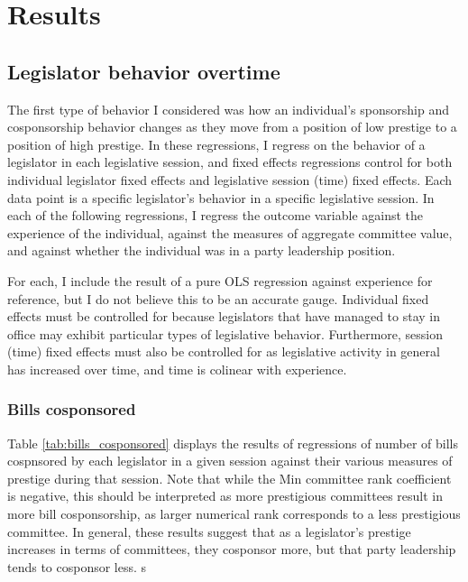 \documentclass{article}
\begin{document}
\section{Results} 
\subsection{Legislator behavior overtime}
The first type of behavior I considered was how an individual's sponsorship and cosponsorship behavior changes as they move from a position of low prestige to a position of high prestige. In these regressions, I regress on the behavior of a legislator in each legislative session, and fixed effects regressions control for both individual legislator fixed effects and legislative session (time) fixed effects. Each data point is a specific legislator's behavior in a specific legislative session. In each of the following regressions, I regress the outcome variable against the experience of the individual, against the measures of aggregate committee value, and against whether the individual was in a party leadership position. 

For each, I include the result of a pure OLS regression against experience for reference, but I do not believe this to be an accurate gauge. Individual fixed effects must be controlled for because legislators that have managed to stay in office may exhibit particular types of legislative behavior. Furthermore, session (time) fixed effects must also be controlled for as legislative activity in general has increased over time, and time is colinear with experience. 

\subsubsection{Bills cosponsored}
Table \ref{tab:bills_cosponsored} displays the results of regressions of number of bills cospnsored by each legislator in a given session against their various measures of prestige during that session. Note that while the Min committee rank coefficient is negative, this should be interpreted as more prestigious committees result in more bill cosponsorship, as larger numerical rank corresponds to a less prestigious committee. In general, these results suggest that as a legislator's prestige increases in terms of committees, they cosponsor more, but that party leadership tends to cosponsor less. s
\end{document}
